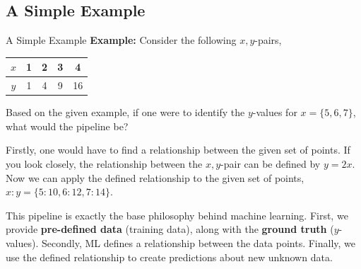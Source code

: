 \documentclass{beamer}
\begin{document}
    \subsection{A Simple Example}
    \begin{frame}[allowframebreaks]{A Simple Example}
        \textbf{Example:} Consider the following \(x,y\)-pairs,

        \medskip
        \begin{tabular}{|c||c|c|c|c|}
            \hline
            \(x\) & 1 & 2 & 3 & 4 \\
            \hline
            \(y\) & 1 & 4 & 9 & 16\\
            \hline
        \end{tabular}
        \medskip
        
        Based on the given example, if one were to identify the \(y\)-values for \(x=\{5,6,7\}\), what would the pipeline be?

        Firstly, one would have to find a relationship between the given set of points. If you look closely, the relationship between the \(x,y\)-pair can be defined by \(y=2x\). Now we can apply the defined relationship to the given set of points, \(x:y=\{5:10,6:12,7:14\}\).

        \pagebreak

        This pipeline is exactly the base philosophy behind machine learning. First, we provide \textbf{pre-defined data} (training data), along with the \textbf{ground truth} (\(y\)-values). Secondly, ML defines a relationship between the data points. Finally, we use the defined relationship to create predictions about new unknown data.
     \end{frame}
\end{document}
